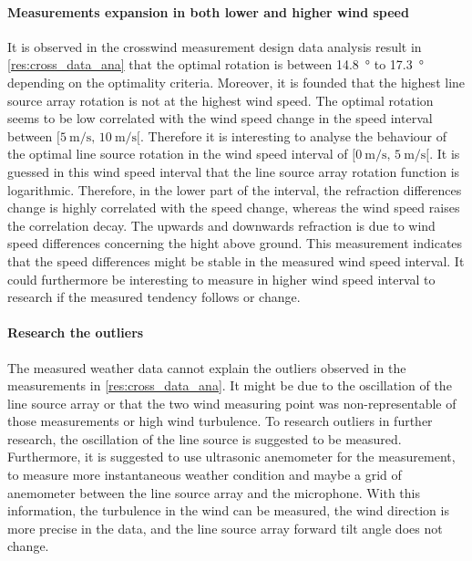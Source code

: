 \paragraph{Measurements expansion in both lower and higher wind speed} 
It is observed in the crosswind measurement design data analysis result in \autoref{res:cross_data_ana} that the optimal rotation is between \SI{14.8}{\degree} to \SI{17.3}{\degree} depending on the optimality criteria. Moreover, it is founded that the highest line source array rotation is not at the highest wind speed. The optimal rotation seems to be low correlated with the wind speed change in the speed interval between $[\SI{5}{\meter\per\second},\, \SI{10}{\meter\per\second}[ $. Therefore it is interesting to analyse the behaviour of the optimal line source rotation in the wind speed interval of $[\SI{0}{\meter\per\second},\, \SI{5}{\meter\per\second}[ $. It is guessed in this wind speed interval that the line source array rotation function is logarithmic. Therefore, in the lower part of the interval, the refraction differences change is highly correlated with the speed change, whereas the wind speed raises the correlation decay. The upwards and downwards refraction is due to wind speed differences concerning the hight above ground. This measurement indicates that the speed differences might be stable in the measured wind speed interval. It could furthermore be interesting to measure in higher wind speed interval to research if the measured tendency follows or change. 



\paragraph{Research the outliers}
The measured weather data cannot explain the outliers observed in the measurements in \autoref{res:cross_data_ana}. It might be due to the oscillation of the line source array or that the two wind measuring point was non-representable of those measurements or high wind turbulence. To research outliers in further research, the oscillation of the line source is suggested to be measured. Furthermore, it is suggested to use ultrasonic anemometer for the measurement, to measure more instantaneous weather condition and maybe a grid of anemometer between the line source array and the microphone. With this information, the turbulence in the wind can be measured, the wind direction is more precise in the data, and the line source array forward tilt angle does not change. 




